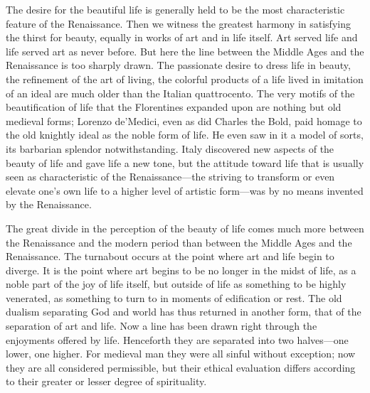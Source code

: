 The desire for the beautiful life is generally held to be the most
characteristic feature of the Renaissance. Then we witness the greatest
harmony in satisfying the thirst for beauty, equally in works of art and
in life itself. Art served life and life served art as never before. But
here the line between the Middle Ages and the Renaissance is too sharply
drawn. The passionate desire to dress life in beauty, the refinement of
the art of living, the colorful products of a life lived in imitation of
an ideal are much older than the Italian quattrocento. The very motifs
of the beautification of life that the Florentines expanded upon are
nothing but old medieval forms; Lorenzo de'Medici, even as did Charles
the Bold, paid homage to the old knightly ideal as the noble form of
life. He even saw in it a model of sorts, its barbarian splendor
notwithstanding. Italy discovered new aspects of the beauty of life and
gave life a new
\protect\hypertarget{09_Chapter_Two__THE_CRAVING_FOR_A_M.xhtmlux5cux23page_40}{}{}tone,
but the attitude toward life that is usually seen as characteristic of
the Renaissance---the striving to transform or even elevate one's own
life to a higher level of artistic form---was by no means invented by
the Renaissance.

The great divide in the perception of the beauty of life comes much more
between the Renaissance and the modern period than between the Middle
Ages and the Renaissance. The turnabout occurs at the point where art
and life begin to diverge. It is the point where art begins to be no
longer in the midst of life, as a noble part of the joy of life itself,
but outside of life as something to be highly venerated, as something to
turn to in moments of edification or rest. The old dualism separating
God and world has thus returned in another form, that of the separation
of art and life. Now a line has been drawn right through the enjoyments
offered by life. Henceforth they are separated into two halves---one
lower, one higher. For medieval man they were all sinful without
exception; now they are all considered permissible, but their ethical
evaluation differs according to their greater or lesser degree of
spirituality.

